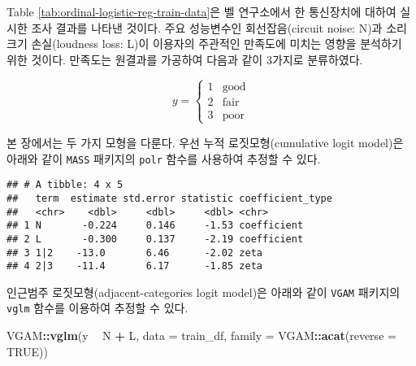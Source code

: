 \documentclass[]{book}
\newenvironment{Shaded}{\begin{snugshade}}{\end{snugshade}}
\newcommand{\DataTypeTok}[1]{\textcolor[rgb]{0.13,0.29,0.53}{#1}}
\newcommand{\KeywordTok}[1]{\textcolor[rgb]{0.13,0.29,0.53}{\textbf{#1}}}
\newcommand{\NormalTok}[1]{#1}
\newcommand{\OperatorTok}[1]{\textcolor[rgb]{0.81,0.36,0.00}{\textbf{#1}}}
\newcommand{\OtherTok}[1]{\textcolor[rgb]{0.56,0.35,0.01}{#1}}
\newcommand{\StringTok}[1]{\textcolor[rgb]{0.31,0.60,0.02}{#1}}
\begin{document}
Table \ref{tab:ordinal-logistic-reg-train-data}은 벨 연구소에서 한 통신장치에 대하여 실시한 조사 결과를 나타낸 것이다. 주요 성능변수인 회선잡음(circuit noise: N)과 소리크기 손실(loudness loss: L)이 이용자의 주관적인 만족도에 미치는 영향을 분석하기 위한 것이다. 만족도는 원결과\citep{cavanaugh1976models}를 가공하여 다음과 같이 3가지로 분류하였다.

\begin{equation*}
y = \begin{cases}
1 & \mbox{good}\\
2 & \mbox{fair}\\
3 & \mbox{poor}
\end{cases}
\end{equation*}

본 장에서는 두 가지 모형을 다룬다. 우선 누적 로짓모형(cumulative logit model)은 아래와 같이 \texttt{MASS} 패키지의 \texttt{polr} 함수를 사용하여 추정할 수 있다.

\begin{Shaded}
\end{Shaded}

\begin{verbatim}
## # A tibble: 4 x 5
##   term  estimate std.error statistic coefficient_type
##   <chr>    <dbl>     <dbl>     <dbl> <chr>           
## 1 N       -0.224     0.146     -1.53 coefficient     
## 2 L       -0.300     0.137     -2.19 coefficient     
## 3 1|2    -13.0       6.46      -2.02 zeta            
## 4 2|3    -11.4       6.17      -1.85 zeta
\end{verbatim}

인근범주 로짓모형(adjacent-categories logit model)은 아래와 같이 \texttt{VGAM} 패키지의 \texttt{vglm} 함수를 이용하여 추정할 수 있다.

\begin{Shaded}
\begin{Highlighting}[]
\NormalTok{VGAM}\OperatorTok{::}\KeywordTok{vglm}\NormalTok{(y }\OperatorTok{~}\StringTok{ }\NormalTok{N }\OperatorTok{+}\StringTok{ }\NormalTok{L,}
           \DataTypeTok{data =}\NormalTok{ train_df,}
           \DataTypeTok{family =}\NormalTok{ VGAM}\OperatorTok{::}\KeywordTok{acat}\NormalTok{(}\DataTypeTok{reverse =} \OtherTok{TRUE}\NormalTok{))}
\end{Highlighting}
\end{Shaded}
\end{document}
